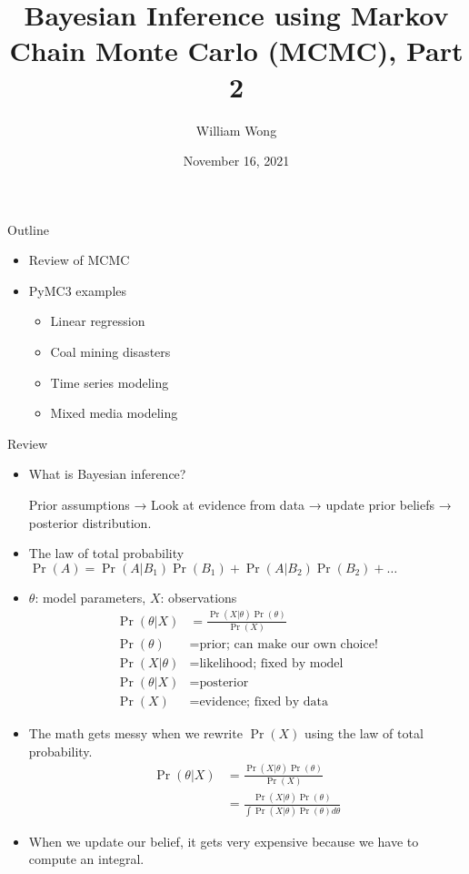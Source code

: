 \documentclass[20pt]{beamer}
\title{Bayesian Inference using Markov Chain Monte Carlo (MCMC), Part 2}
\date{November 16, 2021}
\author{William Wong}
\begin{document}
\begin{frame}
  \titlepage
\end{frame}



\begin{frame}{Outline}
\begin{itemize}
\item Review of MCMC

\item PyMC3 examples
  \begin{itemize}
    \item Linear regression
    \item Coal mining disasters
    \item Time series modeling
    \item Mixed media modeling
  \end{itemize}
\end{itemize}
\end{frame}

\begin{frame}{Review}
\begin{itemize}
  \item What is Bayesian inference?

Prior assumptions → Look at evidence from data → update prior beliefs → posterior distribution.


  \item The law of total probability $\Pr( A ) = \Pr(A | B_1) \Pr(B_1) + \Pr(A | B_2) \Pr(B_2) + \ldots$

  \item $\theta$: model parameters, $X$: observations
    \begin{align*}
    \Pr( \theta | X ) & = \frac{\Pr( X | \theta) \Pr( \theta )}
      {\Pr( X )} \\
    \Pr( \theta ) & = \text{prior; can make our own choice!} \\
    \Pr( X | \theta ) & = \text{likelihood; fixed by model} \\
    \Pr( \theta | X ) & = \text{posterior} \\
    \Pr( X ) & = \text{evidence; fixed by data}
    \end{align*}

  \item The math gets messy when we rewrite $\Pr(X)$ using the law of total probability.
    \begin{align*}
    \Pr( \theta | X ) & = \frac{\Pr( X | \theta) \Pr( \theta )}
      {\Pr( X )} \\
      & = \frac{\Pr( X | \theta) \Pr( \theta )}
        {\int \Pr(X | \theta) \Pr(\theta) d\theta}
    \end{align*}
  \item When we update our belief, it gets very expensive because we have to compute an integral.
\end{itemize}
\end{frame}
\end{document}
